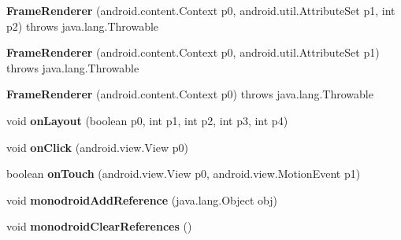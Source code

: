 \begin{DoxyCompactItemize}
\item 
\mbox{\label{classmd5270abb39e60627f0f200893b490a1ade_1_1_frame_renderer_a543d9dca2ecf03f07b3939703cdb19eb}} 
{\bfseries Frame\+Renderer} (android.\+content.\+Context p0, android.\+util.\+Attribute\+Set p1, int p2)  throws java.\+lang.\+Throwable 	
\item 
\mbox{\label{classmd5270abb39e60627f0f200893b490a1ade_1_1_frame_renderer_aea6c9c6c24382a82ce1dec0437826cbc}} 
{\bfseries Frame\+Renderer} (android.\+content.\+Context p0, android.\+util.\+Attribute\+Set p1)  throws java.\+lang.\+Throwable 	
\item 
\mbox{\label{classmd5270abb39e60627f0f200893b490a1ade_1_1_frame_renderer_acee389c5c7dfa4207930e0f43ce1349f}} 
{\bfseries Frame\+Renderer} (android.\+content.\+Context p0)  throws java.\+lang.\+Throwable 	
\item 
\mbox{\label{classmd5270abb39e60627f0f200893b490a1ade_1_1_frame_renderer_aaeb9c0b1ecc2f51b46329b035a54dc53}} 
void {\bfseries on\+Layout} (boolean p0, int p1, int p2, int p3, int p4)
\item 
\mbox{\label{classmd5270abb39e60627f0f200893b490a1ade_1_1_frame_renderer_a939d0d1f06076a305e7ab39feca23eb7}} 
void {\bfseries on\+Click} (android.\+view.\+View p0)
\item 
\mbox{\label{classmd5270abb39e60627f0f200893b490a1ade_1_1_frame_renderer_a0b601208e3a6387a38fd01544ffdb91d}} 
boolean {\bfseries on\+Touch} (android.\+view.\+View p0, android.\+view.\+Motion\+Event p1)
\item 
\mbox{\label{classmd5270abb39e60627f0f200893b490a1ade_1_1_frame_renderer_afab5536e45566fe5a5bb5bd22faef608}} 
void {\bfseries monodroid\+Add\+Reference} (java.\+lang.\+Object obj)
\item 
\mbox{\label{classmd5270abb39e60627f0f200893b490a1ade_1_1_frame_renderer_ad655b8c79cca686e12df7655fe93f7f7}} 
void {\bfseries monodroid\+Clear\+References} ()
\end{DoxyCompactItemize}
